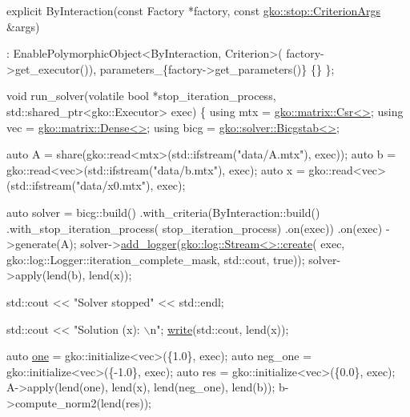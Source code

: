 \begin{DoxyCodeInclude}
    \textcolor{keyword}{explicit} ByInteraction(\textcolor{keyword}{const} Factory *factory,
                           \textcolor{keyword}{const} \hyperlink{structgko_1_1stop_1_1CriterionArgs}{gko::stop::CriterionArgs} &args)

        : EnablePolymorphicObject<ByInteraction, Criterion>(
              factory->get\_executor()),
          parameters\_\{factory->get\_parameters()\}
    \{\}
\};


\textcolor{keywordtype}{void} run\_solver(\textcolor{keyword}{volatile} \textcolor{keywordtype}{bool} *stop\_iteration\_process,
                std::shared\_ptr<gko::Executor> exec)
\{
    \textcolor{keyword}{using} mtx = \hyperlink{classgko_1_1matrix_1_1Csr}{gko::matrix::Csr<>};
    \textcolor{keyword}{using} vec = \hyperlink{classgko_1_1matrix_1_1Dense}{gko::matrix::Dense<>};
    \textcolor{keyword}{using} bicg = \hyperlink{classgko_1_1solver_1_1Bicgstab}{gko::solver::Bicgstab<>};

    \textcolor{keyword}{auto} A = share(gko::read<mtx>(std::ifstream(\textcolor{stringliteral}{"data/A.mtx"}), exec));
    \textcolor{keyword}{auto} b = gko::read<vec>(std::ifstream(\textcolor{stringliteral}{"data/b.mtx"}), exec);
    \textcolor{keyword}{auto} x = gko::read<vec>(std::ifstream(\textcolor{stringliteral}{"data/x0.mtx"}), exec);

    \textcolor{keyword}{auto} solver = bicg::build()
                      .with\_criteria(ByInteraction::build()
                                         .with\_stop\_iteration\_process(
                                             stop\_iteration\_process)
                                         .on(exec))
                      .on(exec)
                      ->generate(A);
    solver->\hyperlink{classgko_1_1log_1_1EnableLogging_a7b3493c14a37b4d46487d9c636d784f2}{add\_logger}(\hyperlink{classgko_1_1log_1_1Stream}{gko::log::Stream<>::create}(
        exec, gko::log::Logger::iteration\_complete\_mask, std::cout, \textcolor{keyword}{true}));
    solver->apply(lend(b), lend(x));

    std::cout << \textcolor{stringliteral}{"Solver stopped"} << std::endl;

    std::cout << \textcolor{stringliteral}{"Solution (x): \(\backslash\)n"};
    \hyperlink{namespacegko_a859dc47a462721d83728d91ab7fa2148}{write}(std::cout, lend(x));

    \textcolor{keyword}{auto} \hyperlink{namespacegko_a0059e27f8f4bc348ff65c1e60caf47c8}{one} = gko::initialize<vec>(\{1.0\}, exec);
    \textcolor{keyword}{auto} neg\_one = gko::initialize<vec>(\{-1.0\}, exec);
    \textcolor{keyword}{auto} res = gko::initialize<vec>(\{0.0\}, exec);
    A->apply(lend(one), lend(x), lend(neg\_one), lend(b));
    b->compute\_norm2(lend(res));


\end{DoxyCodeInclude}

